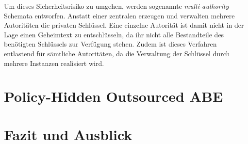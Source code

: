 \documentclass{hsflensburg}
\begin{document}
	Um dieses Sicherheitsrisiko zu umgehen, werden sogenannte
	\textit{multi-authority} Schemata entworfen. Anstatt einer zentralen erzeugen
	und verwalten mehrere Autoritäten die privaten Schlüssel. Eine einzelne
	Autorität ist damit nicht in der Lage einen Geheimtext zu entschlüsseln, da
	ihr nicht alle Bestandteile des benötigten Schlüssels zur Verfügung stehen.
	Zudem ist dieses Verfahren entlastend für sämtliche Autoritäten, da die
	Verwaltung der Schlüssel durch mehrere Instanzen realisiert wird.

	\section{Policy-Hidden Outsourced ABE}
	\section{Fazit und Ausblick}

	\newpage
	
	
\end{document}
